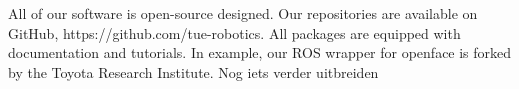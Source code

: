 All of our software is open-source designed. Our repositories are available on GitHub, https://github.com/tue-robotics. All packages are equipped with documentation and tutorials. In example, our ROS wrapper for openface is forked by the Toyota Research Institute.
Nog iets verder uitbreiden